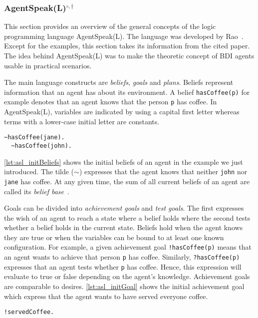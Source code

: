 \subsubsection[AgentSpeak(L)]{AgentSpeak(L)$^{\circ,\dagger}$}\label{fun:apl_asl}
This section provides an overview of the general concepts of the logic programming language AgentSpeak(L).
The language was developed by Rao~\cite{rao_agentspeak_1996}.
Except for the examples, this section takes its information from the cited paper.
The idea behind AgentSpeak(L) was to make the theoretic concept of BDI agents usable in practical scenarios. %

The main language constructs are \emph{beliefs}, \emph{goals} and \emph{plans}.
Beliefs represent information that an agent has about its environment.
A belief \texttt{hasCoffee(p)} for example denotes that an agent knows that the person \texttt{p} has coffee.
In AgentSpeak(L), variables are indicated by using a capital first letter whereas terms with a lower-case initial letter are constants. %
\begin{lstlisting}[caption={Initial beliefs.}, label=lst:asl_initBeliefs]
  ~hasCoffee(jane).
  ~hasCoffee(john).
\end{lstlisting}
\autoref{lst:asl_initBeliefs} shows the initial beliefs of an agent in the example we just introduced.
The tilde ($\sim$) expresses that the agent knows that neither \texttt{john} nor \texttt{jane} has coffee.
At any given time, the sum of all current beliefs of an agent are called its \emph{belief base}~\cite{bordini_jason_2005}. %

Goals can be divided into \emph{achievement goals} and \emph{test goals}.
The first expresses the wish of an agent to reach a state where a belief holds where the second tests whether a belief holds in the current state.
Beliefs hold when the agent knows they are true or when the variables can be bound to at least one known configuration.
For example, a given achievement goal \texttt{!hasCoffee(p)} means that an agent wants to achieve that person \texttt{p} has coffee.
Similarly, \texttt{?hasCoffee(p)} expresses that an agent tests whether \texttt{p} has coffee.
Hence, this expression will evaluate to true or false depending on the agent's knowledge.
Achievement goals are comparable to desires. %
\autoref{lst:asl_initGoal} shows the initial achievement goal which express that the agent wants to have served everyone coffee.
\begin{lstlisting}[firstnumber=3, caption={Initial goal.}, label=lst:asl_initGoal]
  !servedCoffee.
\end{lstlisting}

